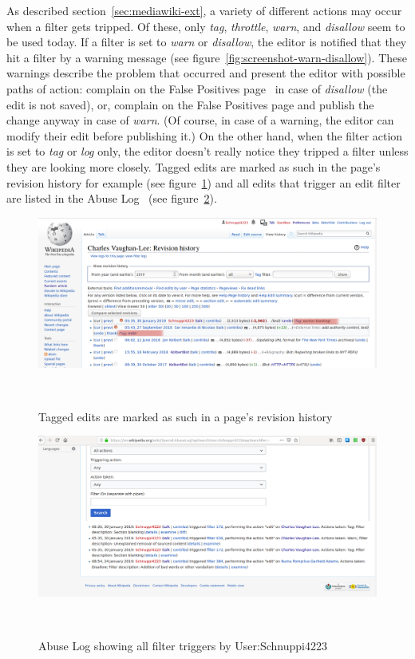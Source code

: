 As described section~\ref{sec:mediawiki-ext}, a variety of different actions may occur when a filter gets tripped.
Of these, only \emph{tag}, \emph{throttle}, \emph{warn}, and \emph{disallow} seem to be used today.
If a filter is set to \emph{warn} or \emph{disallow}, the editor is notified that they hit a filter by a warning message (see figure~\ref{fig:screenshot-warn-disallow}).
These warnings describe the problem that occurred and present the editor with possible paths of action:
complain on the False Positives page~\cite{Wikipedia:EditFilterFalsePositives} in case of \emph{disallow} (the edit is not saved),
or, complain on the False Positives page and publish the change anyway in case of \emph{warn}.
(Of course, in case of a warning, the editor can modify their edit before publishing it.)
On the other hand, when the filter action is set to \emph{tag} or \emph{log} only, the editor doesn't really notice they tripped a filter unless they are looking more closely.
Tagged edits are marked as such in the page's revision history for example (see figure~\ref{fig:tags-in-history})
and all edits that trigger an edit filter are listed in the Abuse Log~\cite{Wikipedia:AbuseLog} (see figure~\ref{fig:screenshot-abuse-log}).

\begin{figure}
\centering
  \includegraphics[width=0.9\columnwidth]{pics/screenshots-filter-trigger/Screenshot-tags-in-revision-history.png}
  \caption{Tagged edits are marked as such in a page's revision history}~\label{fig:tags-in-history}
\end{figure}

\begin{figure}
\centering
  \includegraphics[width=0.9\columnwidth]{pics/screenshots-filter-trigger/Screenshot-abuse-log.png}
  \caption{Abuse Log showing all filter triggers by User:Schnuppi4223}~\label{fig:screenshot-abuse-log}
\end{figure}

